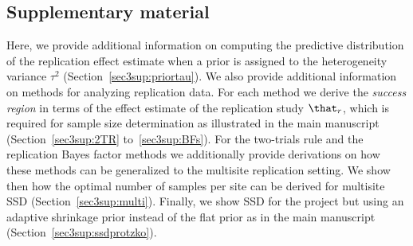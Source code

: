 \begin{subappendices}
\section{Supplementary material}

Here, we provide additional information on computing the predictive distribution
of the replication effect estimate when a prior is assigned to the heterogeneity
variance $\tau^{2}$ (Section~\ref{sec3sup:priortau}). We also provide additional
information on methods for analyzing replication data. For each method we derive
the \emph{success region} in terms of the effect estimate of the replication
study $\that_{r}$, which is required for sample size determination as
illustrated in the main manuscript (Section~\ref{sec3sup:2TR} to~\ref{sec3sup:BFs}). For
the two-trials rule and the replication Bayes factor methods we additionally
provide derivations on how these methods can be generalized to the multisite
replication setting. We show then how the optimal number of samples per site can
be derived for multisite SSD (Section~\ref{sec3sup:multi}). Finally, we show SSD for
the \citet{Protzko2020} project but using an adaptive shrinkage prior instead of
the flat prior as in the main manuscript (Section~\ref{sec3sup:ssdprotzko}).


\end{subappendices}
